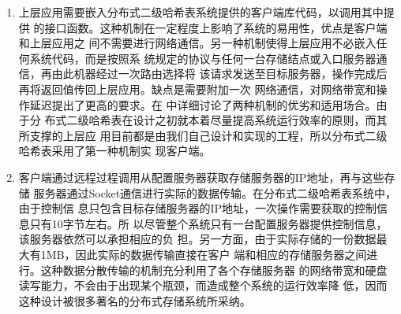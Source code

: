 \begin{enumerate}
  障，该替补配置服务器立刻接替其工作，继承原配置服务器的属性
  \footnote{如IP地址。}，即可实现配置服务器的无缝替换。
  \item 上层应用需要嵌入分布式二级哈希表系统提供的客户端库代码，以调用其中提供
  的接口函数。这种机制在一定程度上影响了系统的易用性，优点是客户端和上层应用之
  间不需要进行网络通信。另一种机制使得上层应用不必嵌入任何系统代码，而是按照系
  统规定的协议与任何一台存储结点或入口服务器通信，再由此机器经过一次路由选择将
  该请求发送至目标服务器，操作完成后再将返回值传回上层应用。缺点是需要附加一次
  网络通信，对网络带宽和操作延迟提出了更高的要求。在
  中详细讨论了两种机制的优劣和适用场合。由于分
  布式二级哈希表在设计之初就本着尽量提高系统运行效率的原则，而其所支撑的上层应
  用目前都是由我们自己设计和实现的工程，所以分布式二级哈希表采用了第一种机制实
  现客户端。
  \item 客户端通过远程过程调用从配置服务器获取存储服务器的IP地址，再与这些存储
  服务器通过Socket通信进行实际的数据传输。在分布式二级哈希表系统中，由于控制信
  息只包含目标存储服务器的IP地址，一次操作需要获取的控制信息只有10字节左右。所
  以尽管整个系统只有一台配置服务器提供控制信息，该服务器依然可以承担相应的负
  担。另一方面，由于实际存储的一份数据最大有1MB，因此实际的数据传输直接在客户
  端和相应的存储服务器之间进行。这种数据分散传输的机制充分利用了各个存储服务器
  的网络带宽和硬盘读写能力，不会由于出现某个瓶颈，而造成整个系统的运行效率降
  低，因而这种设计被很多著名的分布式存储系统所采纳。\cite{ghemawat2003google}
\end{enumerate}
